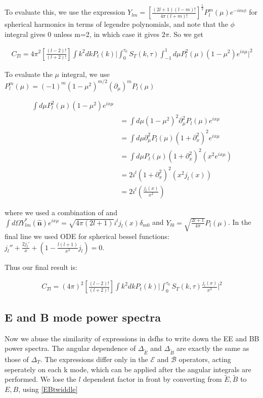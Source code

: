 \documentclass[a4paper,11pt]{article}
\renewcommand{\v}[1]{\mathbf{#1}}
\newcommand{\half}{\frac{1}{2}}
\newcommand{\unit}[1]{\hat{\v{#1}}}
\newcommand{\ltwof}{[\frac{(l-2)!}{(l+2)!}]}
\begin{document}
To evaluate this, we use the expression $Y_{lm} = [\frac{(2l+1)(l-m)!}{4\pi(l+m)!}]^\half P_l^m(\mu)e^{-im\phi}$ for spherical harmonics in terms of legendre polynomials, and note that the $\phi$ integral gives 0 unless m=2, in which case it gives $2\pi$. So we get 

\begin{align}
C_{Tl} = 4\pi^2\ltwof \int k^2 dk P_t(k) \bigg|  \int_0^{\tau_0} S_T(k,\tau)\int_{-1}^1 d\mu P_l^2(\mu)(1-\mu^2)e^{ix\mu} \bigg|^2
\end{align}

To evaluate the $\mu$ integral, we use $P^m_l(\mu)=(-1)^m(1-\mu^2)^{m/2}(\partial_\mu)^mP_l(\mu)$


\begin{align}
\int d\mu P_l^2(\mu)(1-\mu^2)e^{ix\mu} \\
&= \int d\mu(1-\mu^2)^2 \partial_\mu^2P_l(\mu)e^{ix\mu}\\
&= \int d\mu \partial_\mu^2P_l(\mu)(1+\partial_x^2)^2e^{ix\mu}\\
&= \int d\mu P_l(\mu)(1+\partial_x^2)^2(x^2e^{ix\mu})\\
&= 2i^l(1+\partial_x^2)^2(x^2j_l(x))\\
&= 2i^l(\frac{j_l(x)}{x^2})
\end{align}

where we used a combination of and $\int d\Omega Y_{lm}^*(\unit{n})e^{ix\mu} = \sqrt{4\pi(2l+1)}i^l j_l(x) \delta_{m0}$ and $Y_{l0} = \sqrt{\frac{2l+1}{4\pi}}P_l(\mu)$. In the final line we used ODE for spherical bessel functions: $j_l''+\frac{2j_l'}{x}+(1-\frac{l(l+1)}{x^2}j_l)=0$.

Thus our final result is:

\begin{align}
C_{Tl} = (4\pi)^2\ltwof \int k^2 dk P_t(k) \bigg|  \int_0^{\tau_0} S_T(k,\tau)\frac{j_l(x)}{x^2} \bigg|^2
\end{align}

\subsection{E and B mode power spectra}

Now we abuse the similarity of expressions in dsfhs to write down the EE and BB power spectra. The angular dependence of $\Delta_{\tilde{E}}$ and $\Delta_{\tilde{B}}$ are exactly the same as those of $\Delta_T$. The expressions differ only in the $\mathcal{E}$ and $\mathcal{B}$ operators, acting seperately on each k mode, which can be applied after the angular integrals are performed. We lose the $l$ dependent factor in front by converting from $\tilde{E}, \tilde{B}$ to $E,B$, using \ref{EBtwiddle}
\end{document}
